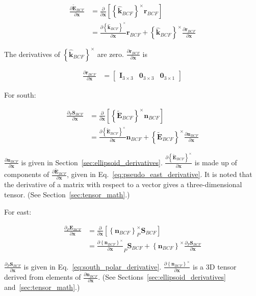 \documentclass[]{article}
\newcommand{\vb}[1]{\bm{#1}} %
\newcommand{\vbh}[1]{\hat{\bm{#1}}} %
\newcommand{\vbt}[1]{\tilde{\bm{#1}}} %
\newcommand{\pd}[2]{\frac{\partial #1}{\partial #2}} %
\begin{document}
\begin{align}
\pd{\vbt{E}_{BCF}}{\vb{x}} &= \pd{}{\vb{x}} \left[ \left\{ \vbh{k}_{BCF} \right\}^{\times} \vb{r}_{BCF} \right] \\
\label{eq:pseudo_east_derivative}
&= \pd{\left\{ \vbh{k}_{BCF} \right\}^{\times}}{\vb{x}} \vb{r}_{BCF} + \left\{ \vbh{k}_{BCF} \right\}^{\times} \pd{\vb{r}_{BCF}}{\vb{x}}
\end{align}

\noindent The derivatives of $\left\{ \vbh{k}_{BCF} \right\}^{\times}$ are zero. $\pd{\vb{r}_{BCF}}{\vb{x}}$ is

\begin{align}
	\pd{\vb{r}_{BCF}}{\vb{x}} &= \left[ \begin{array}{ccc} \vb{I}_{3 \times 3} & \vb{0}_{3 \times 3} & \vb{0}_{3 \times 1} \end{array} \right]
\end{align}

For south:

\begin{align}
	\pd{_P \vb{S}_{BCF}}{\vb{x}} &= \pd{}{\vb{x}} \left[ \left\{ \vbt{E}_{BCF} \right\}^{\times} \vb{n}_{BCF} \right] \\
	\label{eq:south_polar_derivative}
	&= \pd{\left\{ \vbt{E}_{BCF} \right\}^{\times}}{\vb{x}} \vb{n}_{BCF} + \left\{ \vbt{E}_{BCF} \right\}^{\times} \pd{\vb{n}_{BCF}}{\vb{x}}
\end{align}

$\pd{\vb{n}_{BCF}}{\vb{x}}$ is given in Section~\ref{sec:ellipsoid_derivatives}. $\pd{\left\{ \vbt{E}_{BCF} \right\}^{\times}}{\vb{x}}$ is made up of components of $\pd{\vbt{E}_{BCF}}{\vb{x}}$, given in Eq.~\eqref{eq:pseudo_east_derivative}. It is noted that the derivative of a matrix with respect to a vector gives a three-dimensional tensor. (See Section~\ref{sec:tensor_math}.)

For east:

\begin{align}
	\pd{_P \vb{E}_{BCF}}{\vb{x}} &= \pd{}{\vb{x}} \left[ \left\{ \vb{n}_{BCF} \right\}^{\times} _P \vb{S}_{BCF} \right] \\
	&= \pd{\left\{ \vb{n}_{BCF} \right\}^{\times}}{\vb{x}} _P \vb{S}_{BCF} + \left\{ \vb{n}_{BCF} \right\}^{\times} \pd{_P \vb{S}_{BCF}}{\vb{x}}
\end{align}

\noindent $\pd{_P \vb{S}_{BCF}}{\vb{x}}$ is given in Eq.~\eqref{eq:south_polar_derivative}. $\pd{\left\{ \vb{n}_{BCF} \right\}^{\times}}{\vb{x}}$ is a 3D tensor derived from elements of $\pd{\vb{n}_{BCF}}{\vb{x}}$. (See Sections~\ref{sec:ellipsoid_derivatives} and~\ref{sec:tensor_math}.)
\end{document}
